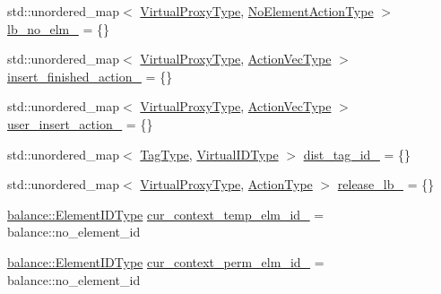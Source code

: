 \begin{DoxyCompactItemize}
\item 
std\+::unordered\+\_\+map$<$ \hyperlink{namespacevt_a1b417dd5d684f045bb58a0ede70045ac}{Virtual\+Proxy\+Type}, \hyperlink{structvt_1_1vrt_1_1collection_1_1_collection_manager_a6b9b76aadc721cec45d3e0e02d849ff1}{No\+Element\+Action\+Type} $>$ \hyperlink{structvt_1_1vrt_1_1collection_1_1_collection_manager_af9d6e82381c808b5463e81643967ea59}{lb\+\_\+no\+\_\+elm\+\_\+} = \{\}
\item 
std\+::unordered\+\_\+map$<$ \hyperlink{namespacevt_a1b417dd5d684f045bb58a0ede70045ac}{Virtual\+Proxy\+Type}, \hyperlink{structvt_1_1vrt_1_1collection_1_1_collection_manager_a51650235f0e53ae08381942eba822679}{Action\+Vec\+Type} $>$ \hyperlink{structvt_1_1vrt_1_1collection_1_1_collection_manager_a6d72877052bc73fa06faacb2161cd57d}{insert\+\_\+finished\+\_\+action\+\_\+} = \{\}
\item 
std\+::unordered\+\_\+map$<$ \hyperlink{namespacevt_a1b417dd5d684f045bb58a0ede70045ac}{Virtual\+Proxy\+Type}, \hyperlink{structvt_1_1vrt_1_1collection_1_1_collection_manager_a51650235f0e53ae08381942eba822679}{Action\+Vec\+Type} $>$ \hyperlink{structvt_1_1vrt_1_1collection_1_1_collection_manager_a8d436079bfbadeacdf0584b01c150c29}{user\+\_\+insert\+\_\+action\+\_\+} = \{\}
\item 
std\+::unordered\+\_\+map$<$ \hyperlink{namespacevt_a84ab281dae04a52a4b243d6bf62d0e52}{Tag\+Type}, \hyperlink{namespacevt_1_1vrt_a84d0891f52f70728c3fc2172cffb464b}{Virtual\+I\+D\+Type} $>$ \hyperlink{structvt_1_1vrt_1_1collection_1_1_collection_manager_ac6d4e3a2e80c670dc5c31c0c02ec0e1f}{dist\+\_\+tag\+\_\+id\+\_\+} = \{\}
\item 
std\+::unordered\+\_\+map$<$ \hyperlink{namespacevt_a1b417dd5d684f045bb58a0ede70045ac}{Virtual\+Proxy\+Type}, \hyperlink{namespacevt_ae0a5a7b18cc99d7b732cb4d44f46b0f3}{Action\+Type} $>$ \hyperlink{structvt_1_1vrt_1_1collection_1_1_collection_manager_a42ea6d7733a75f09738a877e90db9aa1}{release\+\_\+lb\+\_\+} = \{\}
\item 
\hyperlink{namespacevt_1_1vrt_1_1collection_1_1balance_a14c8d2c972f2913aa3f1636e5be0a120}{balance\+::\+Element\+I\+D\+Type} \hyperlink{structvt_1_1vrt_1_1collection_1_1_collection_manager_a0ed427a8b00190e291d7ad7cfa4932f1}{cur\+\_\+context\+\_\+temp\+\_\+elm\+\_\+id\+\_\+} = balance\+::no\+\_\+element\+\_\+id
\item 
\hyperlink{namespacevt_1_1vrt_1_1collection_1_1balance_a14c8d2c972f2913aa3f1636e5be0a120}{balance\+::\+Element\+I\+D\+Type} \hyperlink{structvt_1_1vrt_1_1collection_1_1_collection_manager_adbf8f335a30a005a3d5923a96f6f40c9}{cur\+\_\+context\+\_\+perm\+\_\+elm\+\_\+id\+\_\+} = balance\+::no\+\_\+element\+\_\+id
\end{DoxyCompactItemize}
